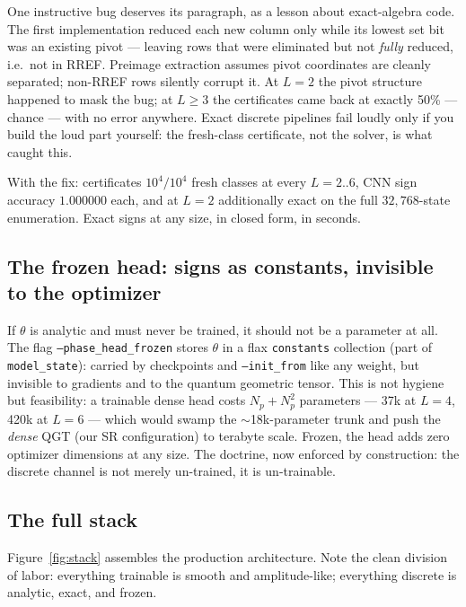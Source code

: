 \documentclass[11pt]{article}
\begin{document}
One instructive bug deserves its paragraph, as a lesson about exact-algebra
code. The first implementation reduced each new column only while its lowest
set bit was an existing pivot --- leaving rows that were eliminated but not
\emph{fully} reduced, i.e.\ not in RREF. Preimage extraction assumes pivot
coordinates are cleanly separated; non-RREF rows silently corrupt it. At
$L=2$ the pivot structure happened to mask the bug; at $L\ge3$ the
certificates came back at exactly 50\% --- chance --- with no error anywhere.
Exact discrete pipelines fail loudly only if you build the loud part
yourself: the fresh-class certificate, not the solver, is what caught this.

With the fix: certificates $10^4/10^4$ fresh classes at every $L=2..6$, CNN
sign accuracy $1.000000$ each, and at $L=2$ additionally exact on the full
$32{,}768$-state enumeration. Exact signs at any size, in closed form, in
seconds.

\subsection{The frozen head: signs as constants, invisible to the optimizer}
\label{sec:frozen}

If $\theta$ is analytic and must never be trained, it should not be a
parameter at all. The flag \texttt{--phase\_head\_frozen} stores $\theta$ in a
flax \texttt{constants} collection (part of \texttt{model\_state}): carried by
checkpoints and \texttt{--init\_from} like any weight, but invisible to
gradients and to the quantum geometric tensor. This is not hygiene but
feasibility: a trainable dense head costs $N_p+N_p^2$ parameters --- 37k at
$L=4$, 420k at $L=6$ --- which would swamp the $\sim$18k-parameter trunk and
push the \emph{dense} QGT (our SR configuration) to terabyte scale. Frozen,
the head adds zero optimizer dimensions at any size. The doctrine, now
enforced by construction: the discrete channel is not merely un-trained, it
is un-trainable.

\subsection{The full stack}

Figure~\ref{fig:stack} assembles the production architecture. Note the clean
division of labor: everything trainable is smooth and amplitude-like;
everything discrete is analytic, exact, and frozen.
\end{document}
